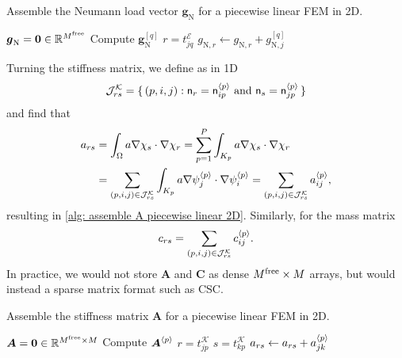 \begin{algorithm}
\caption{Assemble the Neumann load vector $\boldsymbol{g}_{\mathrm{N}}$ for a
piecewise linear FEM in 2D.}
\label{alg: assemble gN piecewise linear 2D}
\begin{algorithmic}
\State $\boldsymbol{g}_{\mathrm{N}}=\boldsymbol{0}\in\mathbb{R}^{M^{\mathrm{free}}}$
    \State Compute $\boldsymbol{g}_{\mathrm{N}}^{[q]}$
        \State $r=t^{\mathcal{E}}_{jq}$
            \State $g_{\mathrm{N},r}\gets
                    g_{\mathrm{N},r}+g^{[q]}_{\mathrm{N},j}$
        \EndIf
    \EndFor
\EndFor
\end{algorithmic}
\end{algorithm}


Turning the stiffness matrix, we define as in 1D
\[
\mathcal{J}^{\mathcal{K}}_{rs}=\{\,(p,i,j):
    \text{$\mathsf{n}_r=\mathsf{n}^{\langle p\rangle}_{ip}$ and
    $\mathsf{n}_s=\mathsf{n}^{\langle p\rangle}_{jp}$}\,\}
\]
and find that
\begin{align*}
a_{rs}&=\int_\Omega a\nabla\chi_s\cdot\nabla\chi_r
    =\sum_{p=1}^P\int_{K_p}a\nabla\chi_s\cdot\nabla\chi_r\\
    &=\sum_{(p,i,j)\in\mathcal{J}^{\mathcal{K}}_{rs}}
    \int_{K_p}a\nabla\psi^{\langle p\rangle}_j\cdot\nabla\psi^{\langle p\rangle}_i
    =\sum_{(p,i,j)\in\mathcal{J}^{\mathcal{K}}_{rs}}a^{\langle p\rangle}_{ij},
\end{align*}
resulting in \cref{alg: assemble A piecewise linear 2D}. Similarly, for the mass
matrix
\[
c_{rs}=\sum_{(p,i,j)\in\mathcal{J}^{\mathcal{K}}_{rs}}c^{\langle p\rangle}_{ij}.
\]
In practice, we would not store $\boldsymbol{A}$ and $\boldsymbol{C}$ as dense
$M^{\mathrm{free}}\times M$ arrays, but would instead a sparse matrix format such as CSC.

\begin{algorithm}
\caption{Assemble the stiffness matrix $\boldsymbol{A}$ for a piecewise linear
FEM in 2D.}
\label{alg: assemble A piecewise linear 2D}
\begin{algorithmic}
\State $\boldsymbol{A}=\boldsymbol{0}\in\mathbb{R}^{M^{\mathrm{free}}\times M}$
    \State Compute $\boldsymbol{A}^{\langle p\rangle}$
        \State $r=t^{\mathcal{K}}_{jp}$
                \State $s=t^{\mathcal{K}}_{kp}$
                \State $a_{rs}\gets a_{rs}+a^{\langle p\rangle}_{jk}$
            \EndFor
        \EndIf
    \EndFor
\EndFor
\end{algorithmic}
\end{algorithm}



